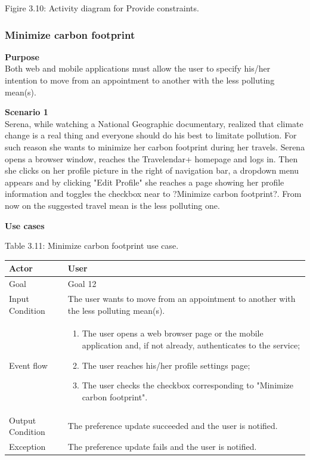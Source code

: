 \documentclass{article}
\begin{document}
\begin{center}
		Figire 3.10: Activity diagram for Provide constraints.
	\end{center}


	\subsubsection{Minimize carbon footprint}
	
	\bigskip
	\noindent
	\textbf{Purpose} \\
	Both web and mobile applications must allow the user to specify his/her intention to move from an appointment to another with the less polluting mean(s).
	
	\bigskip
	\noindent
	\textbf{Scenario 1} \\
	Serena, while watching a National Geographic documentary, realized that climate change is a real thing and everyone should do his best to limitate pollution. For such reason she wants to minimize her carbon footprint during her travels. Serena opens a browser window, reaches the Travelendar+ homepage and logs in. Then she clicks on her profile picture in the right of navigation bar, a dropdown menu appears and by clicking "Edit Profile" she reaches a page showing her profile information and toggles the checkbox near to ?Minimize carbon footprint?. From now on the suggested travel mean is the less polluting one.
	
	\bigskip
	\noindent
	\textbf{Use cases} \\
	
	\begin{center}
		Table 3.11: Minimize carbon footprint use case.
		
		\bigskip
   		\begin{tabular}{p{}|p{}}
   		 	\hline
    			Actor & User \\ \hline
    			Goal & Goal 12 \\ \hline
    			Input Condition & The user wants to move from an appointment to another with the less polluting mean(s). \\ \hline
    			Event flow & 
			\begin{enumerate}
  				\item The user opens a web browser page or the mobile application and, if not already, authenticates to the service;
				\item The user reaches his/her profile settings page;
				\item The user checks the checkbox corresponding to "Minimize carbon footprint".
 			 \end{enumerate} \\ \hline
    			Output Condition & The preference update succeeded and the user is notified. \\ \hline
    			Exception & The preference update fails and the user is notified. \\ \hline
    		\end{tabular}
	\end{center}
	
\end{document}
